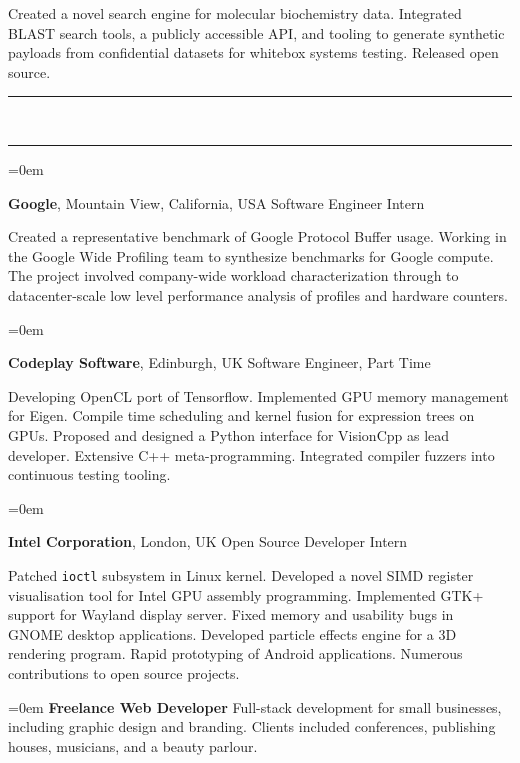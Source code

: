 \documentclass[a4paper,11pt,hidelinks]{scrartcl}
\newcommand{\MarginText}[1]{\marginpar{\raggedleft\itshape\normalsize#1}}
\newcommand{\Title}[1]{\noindent\rule{15cm}{0.4pt}\vspace{-.45em}\\
\noindent\spacedlowsmallcaps{\color{titlecolour}{#1}}

\vspace{-.85em}\noindent\rule{15cm}{0.4pt}\vspace{.2em}}
\newcommand{\Description}[1]{\hangindent=0em\hangafter=0%
\noindent\normalsize{#1}\vspace{1em}}
\newcommand{\ShortJob}[3]{\Description{\MarginText{#1}\textbf{#2},
  \textit{#3}}}
\newcommand{\Job}[4]{\Description{\MarginText{#1}\textbf{#2},
  \textit{#3}\newline\vspace{-.8em}

  \noindent
  #4}}
\begin{document}
\begin{cv}
{  \noindent %
  Created a novel search engine for molecular biochemistry data. Integrated BLAST search tools, a publicly accessible API, and tooling to generate synthetic payloads from confidential datasets for whitebox systems testing. Released open source.
}


\vspace{-1em}
\Title{Professional Experience}

\Description{\MarginText{2018}\textbf{Google}, Mountain View, California, USA
  \newline Software Engineer Intern
  \vspace{.6em}

  \noindent %
  Created a representative benchmark of Google Protocol Buffer usage. Working in the Google Wide Profiling team to synthesize benchmarks for Google compute. The project involved company-wide workload characterization through to datacenter-scale low level performance analysis of profiles and hardware counters.
}

\Description{\MarginText{2016--2018}%
	\textbf{Codeplay Software}, Edinburgh, UK %
	\newline Software Engineer, Part Time
  \vspace{.6em}

  \noindent %
  Developing OpenCL port of Tensorflow. Implemented GPU memory management for Eigen. Compile time scheduling and kernel fusion for expression trees on GPUs. Proposed and designed a Python interface for VisionCpp as lead developer. Extensive C++ meta-programming. Integrated compiler fuzzers into continuous testing tooling.%
}

\Description{\MarginText{2012--2013}\textbf{Intel Corporation}, London, UK
  \newline Open Source Developer Intern
  \vspace{.6em}

	\noindent
  Patched \texttt{ioctl} subsystem in Linux kernel. Developed a novel SIMD register visualisation tool for Intel GPU assembly programming. Implemented GTK+ support for Wayland display server. Fixed memory and usability bugs in GNOME desktop applications. Developed particle effects engine for a 3D rendering program. Rapid prototyping of Android applications. Numerous contributions to open source projects.%
}

\Description{\MarginText{2010--2017}\textbf{Freelance Web Developer}
	\newline %
  Full-stack development for small businesses, including graphic design and branding. Clients included conferences, publishing houses, musicians, and a beauty parlour.%
}


\end{cv}
\end{document}
